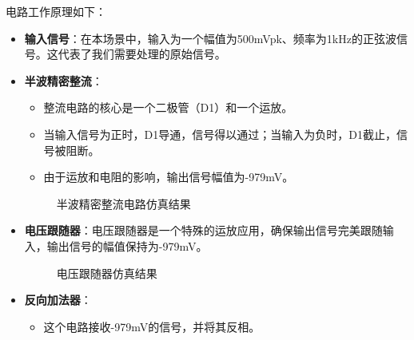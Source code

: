 \documentclass[UTF8,titlepage,a4paper]{ctexart}
\numberwithin{figure}{section}
\begin{document}
电路工作原理如下：
\begin{itemize}
    \item \textbf{输入信号}：在本场景中，输入为一个幅值为500mVpk、频率为1kHz的正弦波信号。这代表了我们需要处理的原始信号。
    
    \item \textbf{半波精密整流}：
    \begin{itemize}
        \item 整流电路的核心是一个二极管（D1）和一个运放。
        \item 当输入信号为正时，D1导通，信号得以通过；当输入为负时，D1截止，信号被阻断。
        \item 由于运放和电阻的影响，输出信号幅值为-979mV。
    \end{itemize}
    \begin{figure}[H]
        \centering
         \caption{半波精密整流电路仿真结果}
         \label{}
        \end{figure}
    \item \textbf{电压跟随器}：电压跟随器是一个特殊的运放应用，确保输出信号完美跟随输入，输出信号的幅值保持为-979mV。
    \begin{figure}[H]
        \centering
         \caption{电压跟随器仿真结果}
         \label{}
        \end{figure}
    \item \textbf{反向加法器}：
    \begin{itemize}
        \item 这个电路接收-979mV的信号，并将其反相。

\end{itemize}
\end{itemize}
\end{document}
